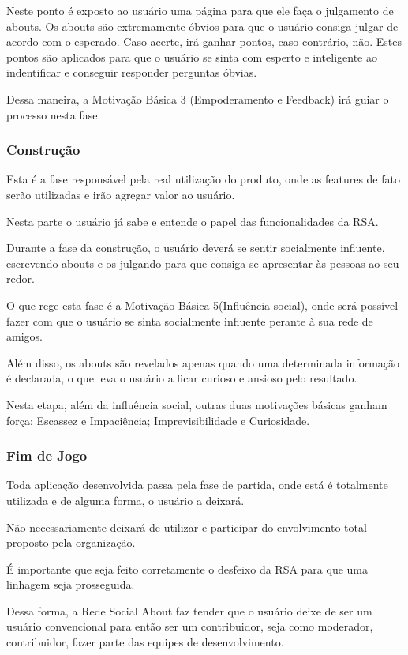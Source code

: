 Neste ponto é exposto ao usuário uma página para que ele faça o julgamento de 
abouts.
Os abouts são extremamente óbvios para que o usuário consiga julgar de acordo 
com o
esperado. Caso acerte, irá ganhar pontos, caso contrário, não. Estes pontos
são aplicados para que o usuário se sinta com esperto e inteligente ao 
indentificar e conseguir responder perguntas óbvias.

Dessa maneira, a Motivação Básica 3 (Empoderamento e Feedback) irá guiar o
processo nesta fase.

\subsubsection{Construção}
\label{sub:constru_o}
Esta é a fase responsável pela real utilização do produto, onde as features
de fato serão utilizadas e irão agregar valor ao usuário.

Nesta parte o usuário já sabe e entende o papel das funcionalidades da RSA.

Durante a fase da construção, o usuário deverá se sentir socialmente influente,
escrevendo abouts e os julgando para que consiga se apresentar às pessoas ao seu redor.

O que rege esta fase é a Motivação Básica 5(Influência social), onde será possível
fazer com que o usuário se sinta socialmente influente perante à sua rede de amigos.

Além disso, os abouts são revelados apenas quando uma determinada informação
é declarada, o que leva o usuário a ficar curioso e ansioso pelo resultado. 

Nesta etapa, além da influência social, outras duas motivações básicas ganham 
força: Escassez e Impaciência; Imprevisibilidade e Curiosidade.

\subsubsection{Fim de Jogo}
\label{sub:fim_de_jogo}
Toda aplicação desenvolvida passa pela fase de partida, onde está é totalmente utilizada
e de alguma forma, o usuário a deixará. 

Não necessariamente deixará de utilizar e participar do envolvimento total proposto pela
organização.

É importante que seja feito corretamente o desfeixo da RSA para que uma linhagem seja
prosseguida.

Dessa forma, a Rede Social About faz tender que o usuário deixe de ser um usuário
convencional para então ser um contribuidor,  seja como moderador, contribuidor,
fazer parte das equipes de desenvolvimento.

